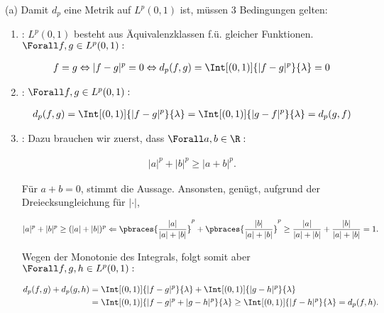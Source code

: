 \begin{solution}

(a)
Damit $d_p$ eine Metrik auf $L^p(0, 1)$ ist, müssen 3 Bedingungen gelten:

\begin{enumerate}[label = (\roman*)]

  \item
  :
  $L^p(0, 1)$ besteht aus Äquivalenzklassen f.ü. gleicher Funktionen. $\Forall f, g \in L^p(0, 1):$

  \begin{align*}
    f = g
    \Leftrightarrow
    |f - g|^p = 0
    \Leftrightarrow
    d_p(f, g)
    =
    \Int[(0, 1)]{|f - g|^p}{\lambda} = 0
  \end{align*}

  \item
  :
  $\Forall f, g \in L^p(0, 1):$

  \begin{align*}
    d_p(f, g)
    =
    \Int[(0, 1)]{|f - g|^p}{\lambda}
    =
    \Int[(0, 1)]{|g - f|^p}{\lambda}
    =
    d_p(g, f)
  \end{align*}

  \item
  :
  Dazu brauchen wir zuerst, dass $\Forall a, b \in \R:$

  \begin{align*}
    |a|^p + |b|^p \geq |a + b|^p.
  \end{align*}

  Für $a + b = 0$, stimmt die Aussage.
  Ansonsten, genügt, aufgrund der Dreiecksungleichung für $|\cdot|$,

  \begin{align*}
    |a|^p + |b|^p \geq (|a| + |b|)^p
    \Leftarrow
    \pbraces{\frac{|a|}{|a| + |b|}}^p +
    \pbraces{\frac{|b|}{|a| + |b|}}^p
    \geq
    \frac{|a|}{|a| + |b|} +
    \frac{|b|}{|a| + |b|} = 1.
  \end{align*}

  Wegen der Monotonie des Integrals, folgt somit aber $\Forall f, g, h \in L^p(0, 1):$

  \begin{align*}
    d_p(f, g) + d_p(g, h)
    & =
    \Int[(0, 1)]{|f - g|^p}{\lambda} +
    \Int[(0, 1)]{|g - h|^p}{\lambda} \\
    & =
    \Int[(0, 1)]{|f - g|^p + |g - h|^p}{\lambda}
    \geq
    \Int[(0, 1)]{|f - h|^p}{\lambda}
    =
    d_p(f, h).
  \end{align*}


\end{enumerate}
\end{solution}
